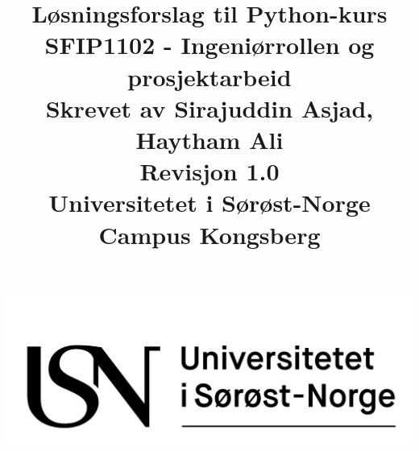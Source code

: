 \documentclass{article}
\title{
    \textbf{Løsningsforslag til Python-kurs}
    \\SFIP1102 - Ingeniørrollen og prosjektarbeid\\[1cm]
    \Large{Skrevet av Sirajuddin Asjad, Haytham Ali\\
    Revisjon 1.0\\[1cm]
    \textbf{Universitetet i Sørøst-Norge\\Campus Kongsberg}}
}
\author{}
\date{}
\begin{document}
\begin{center}\includegraphics[width=14cm]{img/usn3.png}\end{center}
{\let\newpage\relax\maketitle}\newpage
{}
\renewcommand{\contentsname}{Innholdsfortegnelse}
\tableofcontents\newpage


\end{document}
